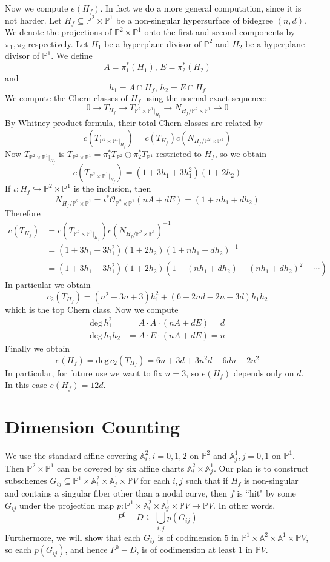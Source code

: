 \documentclass[12pt]{article}
\theoremstyle{plain}
\theoremstyle{definition}
\newcommand{\IA}{\mathbb{A}}
\newcommand{\IP}{\mathbb{P}}
\newcommand{\sO}{\mathcal{O}}
\renewcommand{\deg}{\mathrm{deg}\,}
\newcommand\union{\bigcup}
\newcommand{\<}{\langle}
\renewcommand{\>}{\rangle}
\newcommand{\into}{\hookrightarrow}
\begin{document}
Now we compute $e(H_f)$. In fact we do a more general computation, since it is not harder. Let $H_f \subseteq \IP^2 \times \IP^1$ be a non-singular hypersurface of bidegree $(n, d)$. We denote the projections of $\IP^2 \times \IP^1$ onto the first and second components by $\pi_1, \pi_2$ respectively. Let $H_1$ be a hyperplane divisor of $\IP^2$ and $H_2$ be a hyperplane divisor of $\IP^1$. We define 
$$ A = \pi_1^*(H_1), \, E = \pi_2^*(H_2) $$
and $$ h_1 = A \cap H_f, \, h_2 = E \cap H_f $$
We compute the Chern classes of $H_f$ using the normal exact sequence:
$$ 0 \to T_{H_f} \to T_{\IP^2 \times \IP^1|_{H_f}} \to N_{H_f/\IP^2 \times \IP^1} \to 0$$
By Whitney product formula, their total Chern classes are related by
$$ c(T_{\IP^2 \times \IP^1|_{H_f}}) = c(T_{H_f}) c(N_{H_f/\IP^2 \times \IP^1}) $$
Now $T_{\IP^2 \times \IP^1|_{H_f}}$ is $T_{\IP^2 \times \IP^1} = \pi_1^* T_{\IP^2} \oplus \pi_2^* T_{\IP^1}$ restricted to $H_f$, so we obtain 
$$ c(T_{\IP^2 \times \IP^1|_{H_f}}) = (1 + 3h_1 + 3h_1^2)(1 + 2h_2) $$
If $\iota : H_f \into \IP^2 \times \IP^1$ is the inclusion, then $$N_{H_f/\IP^2 \times \IP^1} = \iota^* \sO_{\IP^2 \times \IP^1}(nA  + dE) = (1 + nh_1 + dh_2)$$
Therefore 
\begin{align*}
c(T_{H_f}) &= c(T_{\IP^2 \times \IP^1|_{H_f}})c(N_{H_f/\IP^2 \times \IP^1})^{-1}\\
&= (1 + 3h_1 + 3h_1^2)(1 + 2h_2)(1 + nh_1 + dh_2)^{-1}\\
&= (1 + 3h_1 + 3h_1^2)(1 + 2h_2)(1 - (nh_1 + dh_2) + (nh_1 + dh_2)^2 - \cdots)
\end{align*}
In particular we obtain 
$$ c_2(T_{H_f}) = (n^2 - 3n + 3)h_1^2 + (6 + 2nd - 2n - 3d)h_1 h_2 $$
which is the top Chern class. Now we compute 
\begin{align*}
\deg h_1^2 &= A \cdot A \cdot (nA + dE) = d \\
\deg h_1 h_2 &= A \cdot E \cdot (nA + dE) = n 
\end{align*}
Finally we obtain 
$$ e(H_f) = \deg c_2(T_{H_f}) = 6n + 3d + 3n^2 d - 6 dn - 2n^2 $$
In particular, for future use we want to fix $n = 3$, so $e(H_f)$ depends only on $d$. In this case $e(H_f) = 12 d$.  

\section{Dimension Counting}
We use the standard affine covering $\IA_i^2, i = 0, 1, 2$ on $\IP^2$ and $\IA_j^1, j = 0, 1$ on $\IP^1$. Then $\IP^2 \times \IP^1$ can be covered by six affine charts $\IA^2_i \times \IA^1_j$. Our plan is to construct subschemes $G_{ij} \subseteq \IP^1 \times \IA_i^2 \times \IA_j^1 \times \IP V$ for each $i, j$ such that if $H_f$ is non-singular and contains a singular fiber other than a nodal curve, then $f$ is ``hit" by some $G_{ij}$ under the projection map $p : \IP^1 \times \IA_i^2 \times \IA_j^1 \times \IP V \to \IP V$. In other words, $$P^0 - D \subseteq \union_{i, j} p(G_{ij})$$ Furthermore, we will show that each $G_{ij}$ is of codimension $5$ in $\IP^1 \times \IA^2 \times \IA^1 \times \IP V$, so each $p(G_{ij})$, and hence $P^0 - D$, is of codimension at least $1$ in $\IP V$. 
\end{document}
